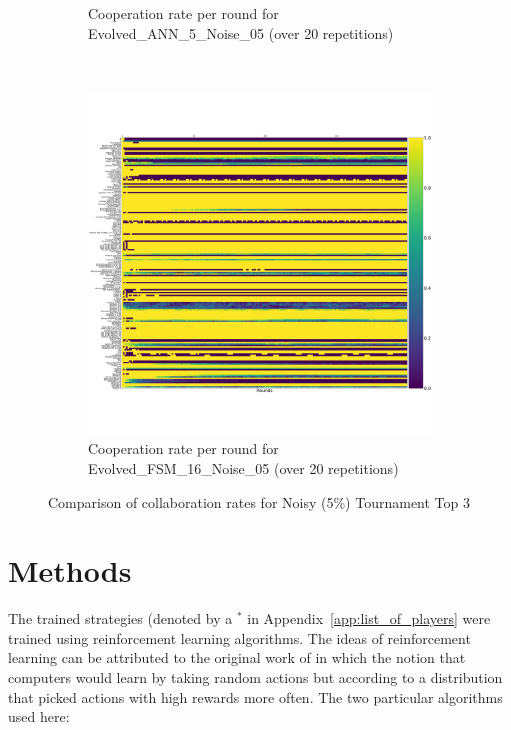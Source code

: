 \documentclass{article}
\begin{document}
\begin{figure}[!hbtp]
\begin{subfigure}[t]{.3\textwidth}
        \caption{Cooperation rate per round for Evolved\_ANN\_5\_Noise\_05 (over 20
        repetitions)}
    \end{subfigure}%
    ~
    \begin{subfigure}[t]{.3\textwidth}
        \centering
        \includegraphics[width=\textwidth]{./assets/cooperation_0_0_20_Evolved_FSM_16_Noise_05_array.pdf}
        \caption{Cooperation rate per round for Evolved\_FSM\_16\_Noise\_05 (over 20
        repetitions)}
    \end{subfigure}%

    \caption{Comparison of collaboration rates for Noisy (5\%) Tournament Top 3}
    \label{fig:comparison_cooperation_heatmaps_noisy}
\end{figure}


\section{Methods}\label{sec:methods}

The trained strategies (denoted by a \(^{*}\) in
Appendix~\ref{app:list_of_players} were trained using reinforcement
learning algorithms. The ideas of reinforcement learning can be attributed to
the original work of \cite{turing1950computing} in which the notion that
computers would learn by taking random actions but according to a distribution
that picked actions with high rewards more often. The two particular algorithms
used here:
\end{document}
